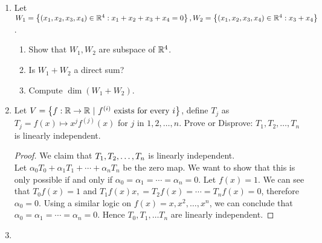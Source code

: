 \begin{enumerate}
    \begin{proof}[Alternative Proof.]
        Consider $T \in \b F^n \to \b F^n$ be defined as \[T(v_1) = v_1 - v_2, T(v_2) = v_2 - v_3, \ldots, T(v_n) = v_n - v_1\] We can see that $\text{range } T = \spa (v_1 - v_2, v_2 - v_3, \ldots, v_n - v_1)$. Write everything in terms of matrix notation: 
        \[\bml 
        1 & 0 & \cdots & 0 & -1 \\
        -1 & 1 & \cdots & 0 & 0 \\
        \vdots & \vdots & \ddots & \vdots & \vdots  \\
        0 & 0 & \cdots & 1 & 0 \\
        0 & 0 & \cdots & -1 & 1 \\
        \bmr\] row reduce the matrix and we can see that $\dim \text{range } T = n - 1$.
    \end{proof}
    \item Let $W_1  = \left\{ (x_1, x_2, x_3, x_4 ) \in \mathbb R^4 : x_1 + x_2 + x_3 + x_4 = 0 \right\}, W_2 = \left\{ (x_1, x_2, x_3, x_4 ) \in \mathbb R^4 : x_3  + x_4 \right\}$. 
    \begin{enumerate}[label = \roman*.]
        \item Show that $W_1, W_2$ are subspace of $\mathbb R^4$.
        \item Is $W_1 + W_2$ a direct sum?
        \item Compute $\dim (W_1 + W_2)$.
    \end{enumerate}
    \item Let $V = \lb f: \b R \to \b R \ | \ f^{(i)} \text{ exists for every } i \rb$, define $T_j$ as $T_j = f(x) \mapsto x^{j} f^{(j)}(x)$ for $j$ in $1, 2, \ldots, n$. Prove or Disprove: $T_1, T_2, \ldots, T_n$ is linearly independent.
    \begin{proof}
        We claim that ${T}_1,{T}_2, \ldots, {T}_{n}$ is linearly independent. \\ 
        Let $\alpha_0 T_0 + \alpha_1 T_1 + \cdots + \alpha_n T_n$ be the zero map. We want to show that this is only possible if and only if $\alpha_0 = \alpha_1 = \cdots = \alpha_n = 0$.
        Let $f(x) = 1$. We can see that $T_0 f(x) = 1$ and $T_1 f(x) x, = T_2 f(x) = \cdots = T_n f(x) = 0$, therefore $\alpha_0 = 0$. Using a similar logic on $f(x) = x, x^2, \ldots, x^n$, we can conclude that $\alpha_0 = \alpha_1 = \cdots = \alpha_n = 0$. Hence $T_0, T_1, \ldots T_n$ are linearly independent.
    \end{proof}
    \item  
\end{enumerate}